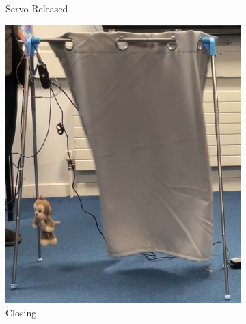 \documentclass[a4paper,12pt]{article}
\begin{document}
\begin{figure}
\begin{subfigure}[][][]{0.24\textwidth}
        \caption{Servo Released}
    \end{subfigure}
        \begin{subfigure}[][][]{0.24\textwidth}
        \includegraphics[width=\linewidth]{figures/model_curtainClosing2.png}
        \caption{Closing}
    \end{subfigure}
    \begin{subfigure}[][][]{0.24\textwidth}

\end{subfigure}
\end{figure}
\end{document}
